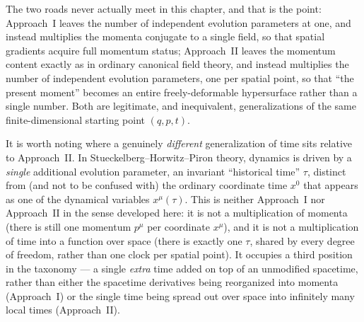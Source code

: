 The two roads never actually meet in this chapter, and that is the point:
Approach~I leaves the number of independent evolution parameters at one, and
instead multiplies the momenta conjugate to a single field, so that spatial
gradients acquire full momentum status; Approach~II leaves the momentum content
exactly as in ordinary canonical field theory, and instead multiplies the
number of independent evolution parameters, one per spatial point, so that
``the present moment'' becomes an entire freely-deformable hypersurface rather
than a single number. Both are legitimate, and inequivalent, generalizations of
the same finite-dimensional starting point $(q,p,t)$.

It is worth noting where a genuinely \emph{different} generalization of time
sits relative to Approach~II. In Stueckelberg--Horwitz--Piron theory, dynamics
is driven by a \emph{single} additional evolution parameter, an invariant
``historical time'' $\tau$, distinct from (and not to be confused with) the
ordinary coordinate time $x^0$ that appears as one of the dynamical variables
$x^\mu(\tau)$. This is neither Approach~I nor Approach~II in the sense
developed here: it is not a multiplication of momenta (there is still one
momentum $p^\mu$ per coordinate $x^\mu$), and it is not a multiplication of
time into a function over space (there is exactly one $\tau$, shared by every
degree of freedom, rather than one clock per spatial point). It occupies a
third position in the taxonomy --- a single \emph{extra} time added on top of
an unmodified spacetime, rather than either the spacetime derivatives being
reorganized into momenta (Approach~I) or the single time being spread out over
space into infinitely many local times (Approach~II).

